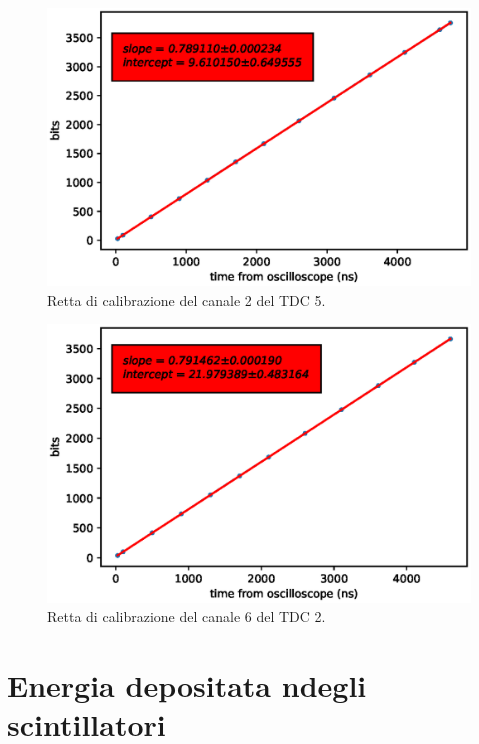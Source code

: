 \begin{figure}[H]
  \centering
  \includegraphics[width=.8\textwidth]{plots/tdc25.eps}
  \caption{Retta di calibrazione del canale 2 del TDC 5.}
  \label{fig:tdc25}
\end{figure}

\begin{figure}[H]
  \centering
  \includegraphics[width=.8\textwidth]{plots/tdc26.eps}
  \caption{Retta di calibrazione del canale 6 del TDC 2.}
  \label{fig:tdc26}
\end{figure}




\chapter{Energia depositata ndegli scintillatori}             %

